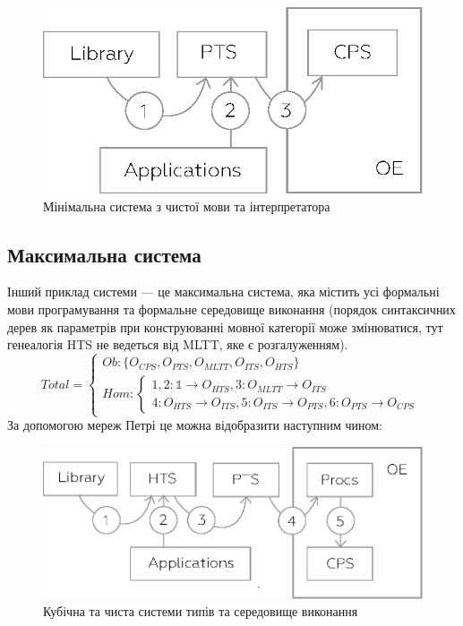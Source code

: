 \begin{figure}
  \centerline{\includegraphics[scale=0.6]{minimal.eps}}
  \caption{Мінімальна система з чистої мови та інтерпретатора}
\end{figure}

\subsection{Максимальна система}
Інший приклад системи --- це максимальна система, яка містить усі формальні
мови програмування та формальне середовище виконання (порядок синтаксичних дерев
як параметрів при конструюванні мовної категорії може змінюватися, тут
генеалогія HTS не ведеться від MLTT, яке є розгалуженням).
\begin{equation}
Total = 
\begin{cases}
Ob: \{ O_{CPS}, O_{PTS}, O_{MLTT}, O_{ITS}, O_{HTS} \} \\
Hom: \begin{cases}
1,2: \mathbb{1} \rightarrow O_{HTS}, 3: O_{MLTT} \rightarrow O_{ITS} \\
4: O_{HTS} \rightarrow O_{ITS}, 5: O_{ITS} \rightarrow O_{PTS}, 6: O_{PTS} \rightarrow O_{CPS}
\end{cases}
\end{cases}
\end{equation}
За допомогою мереж Петрі це можна відобразити наступним чином:
\begin{figure}[ht]
  \centerline{\includegraphics[scale=0.6]{higher.eps}}
  \caption{Кубічна та чиста системи типів та середовище виконання}
\end{figure}

